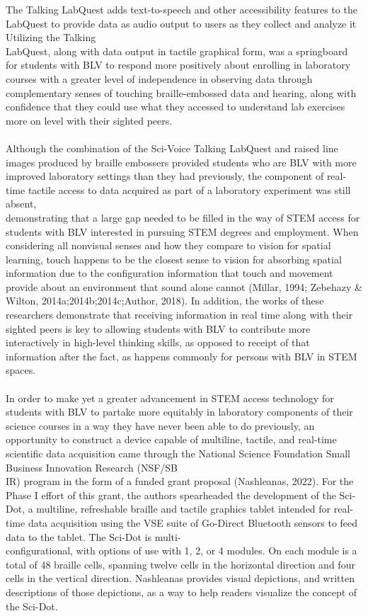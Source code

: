 \documentclass[11.5pt]{sig-alternate}
\begin{document}
\begin{large}
The Talking LabQuest adds text-to-speech and other accessibility features to the LabQuest to provide data as audio output to users as they collect and analyze it Utilizing the Talking \\LabQuest, along with data output in tactile graphical form, was a springboard for students with BLV to respond more positively about enrolling in laboratory courses with a greater level of independence in observing data through complementary senses of touching braille-embossed data and hearing, along with confidence that they could use what they accessed to understand lab exercises more on level with their sighted peers.
\\\\Although the combination of the Sci-Voice Talking LabQuest and raised line images produced by braille embossers provided students who are BLV with more improved laboratory settings than they had previously, the component of real-time tactile access to data acquired as part of a laboratory experiment was still absent, \\demonstrating that a large gap needed to be filled in the way of STEM access for students with BLV interested in pursuing STEM degrees and employment. When considering all nonvisual senses and how they compare to vision for spatial learning, touch happens to be the closest sense to vision for absorbing spatial information due to the configuration information that touch and movement provide about an environment that sound alone cannot (Millar, 1994; Zebehazy \& Wilton, 2014a;2014b;2014c;Author, 2018). In addition, the works of these researchers demonstrate that receiving information in real time along with their sighted peers is key to allowing students with BLV to contribute more interactively in high-level thinking skills, as opposed to receipt of that information after the fact, as happens commonly for persons with BLV in STEM spaces.
\\\\In order to make yet a greater advancement in STEM access technology for students with BLV to partake more equitably in laboratory components of their science courses in a way they have never been able to do previously, an opportunity to construct a device capable of multiline, tactile, and real-time scientific data acquisition came through the National Science Foundation Small Business Innovation Research (NSF/SB\\IR) program in the form of a funded grant proposal (Nashleanas, 2022). For the Phase I effort of this grant, the authors spearheaded the development of the Sci-Dot, a multiline, refreshable braille and tactile graphics tablet intended for real-time data acquisition using the VSE suite of Go-Direct Bluetooth sensors to feed data to the tablet. The Sci-Dot is multi-\\configurational, with options of use with 1, 2, or 4 modules. On each module is a total of 48 braille cells, spanning twelve cells in the horizontal direction and four cells in the vertical direction. Nashleanas provides visual depictions, and written descriptions of those depictions, as a way to help readers visualize the concept of the Sci-Dot.

\end{large}
\end{document}
